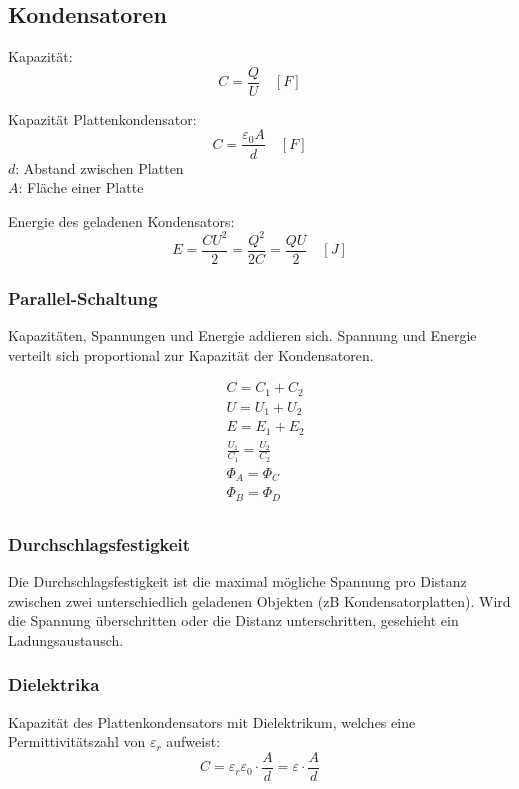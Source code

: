 \subsection{Kondensatoren}

Kapazität:
\[
	C = \frac{Q}{U} \quad \left[F\right]
\]

Kapazität Plattenkondensator:
\[
	C = \frac{\varepsilon_0 A}{d} \quad \left[F\right]
\]
$d$: Abstand zwischen Platten\\
$A$: Fläche einer Platte

Energie des geladenen Kondensators:
\[
	E = \frac{CU^2}{2} = \frac{Q^2}{2C} = \frac{QU}{2} \quad \left[J\right]
\]

\subsubsection{Parallel-Schaltung}

Kapazitäten, Spannungen und Energie addieren sich. Spannung und Energie verteilt
sich proportional zur Kapazität der Kondensatoren.

\begin{minipage}{.5\linewidth}
	
\end{minipage}
\begin{minipage}{.5\linewidth}
	\begin{align*}
		& C = C_1 + C_2 \\
		& U = U_1 + U_2 \\
		& E = E_1 + E_2 \\
		& \frac{U_1}{C_1} = \frac{U_2}{C_2} \\
		& \Phi_A = \Phi_C \\
		& \Phi_B = \Phi_D \\
	\end{align*}
\end{minipage}

\subsubsection{Durchschlagsfestigkeit}

Die Durchschlagsfestigkeit ist die maximal mögliche Spannung pro Distanz
zwischen zwei unterschiedlich geladenen Objekten (zB Kondensatorplatten). Wird
die Spannung überschritten oder die Distanz unterschritten, geschieht ein
Ladungsaustausch.

\subsubsection{Dielektrika}

Kapazität des Plattenkondensators mit Dielektrikum, welches eine
Permittivitätszahl von $\varepsilon_r$ aufweist:
\[
	C = \varepsilon_r \varepsilon_0 \cdot \frac{A}{d} = \varepsilon \cdot \frac{A}{d}
\]
